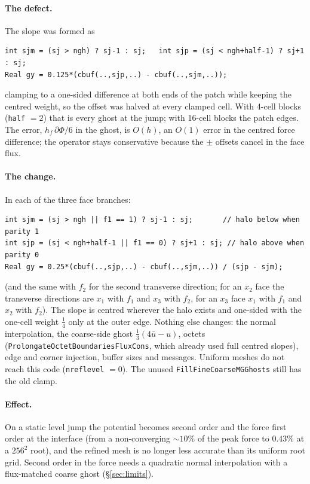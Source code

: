 \documentclass[11pt]{article}
\newcommand{\code}[1]{\texttt{#1}}
\newcommand{\fn}[1]{\texttt{\small #1}}
\begin{document}
\paragraph{The defect.} The slope was formed as
\begin{verbatim}
int sjm = (sj > ngh) ? sj-1 : sj;   int sjp = (sj < ngh+half-1) ? sj+1 : sj;
Real gy = 0.125*(cbuf(..,sjp,..) - cbuf(..,sjm,..));
\end{verbatim}
clamping to a one-sided difference at both ends of the patch while keeping the centred weight, so
the offset was halved at every clamped cell. With 4-cell blocks (\code{half} $= 2$) that is every
ghost at the jump; with 16-cell blocks the patch edges. The error, $h_f\,\partial\Phi/6$ in the
ghost, is $O(h)$, an $O(1)$ error in the centred force difference; the operator stays conservative
because the $\pm$ offsets cancel in the face flux.

\paragraph{The change.} In each of the three face branches:
\begin{verbatim}
int sjm = (sj > ngh || f1 == 1) ? sj-1 : sj;       // halo below when parity 1
int sjp = (sj < ngh+half-1 || f1 == 0) ? sj+1 : sj; // halo above when parity 0
Real gy = 0.25*(cbuf(..,sjp,..) - cbuf(..,sjm,..)) / (sjp - sjm);
\end{verbatim}
(and the same with $f_2$ for the second transverse direction; for an $x_2$ face the transverse
directions are $x_1$ with $f_1$ and $x_3$ with $f_2$, for an $x_3$ face $x_1$ with $f_1$ and $x_2$
with $f_2$). The slope is centred wherever the halo exists and one-sided with the one-cell weight
$\tfrac14$ only at the outer edge. Nothing else changes: the normal interpolation, the coarse-side
ghost $\tfrac13(4\bar u - u)$, octets (\fn{ProlongateOctetBoundariesFluxCons}, which already used
full centred slopes), edge and corner injection, buffer sizes and messages. Uniform meshes do not
reach this code (\code{nreflevel} $= 0$). The unused \fn{FillFineCoarseMGGhosts} still has the old
clamp.

\paragraph{Effect.} On a static level jump the potential becomes second order and the force first
order at the interface (from a non-converging $\sim\!10\%$ of the peak force to $0.43\%$ at a
$256^2$ root), and the refined mesh is no longer less accurate than its uniform root grid.
Second order in the force needs a quadratic normal interpolation with a flux-matched coarse
ghost (\S\ref{sec:limits}).
\end{document}
